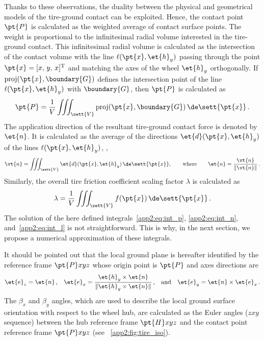 Thanks to these observations, the duality between the physical and geometrical models of the tire-ground contact can be exploited. Hence, the contact point $\pt{P}$ is calculated as the weighted average of contact surface points. The weight is proportional to the infinitesimal radial volume interested in the tire-ground contact. This infinitesimal radial volume is calculated as the intersection of the contact volume with the line $\ell(\pt{x},\et{h}_y)$ passing through the point $\pt{x} = [x, \, y, \, x]^\mathrm{T}$ and matching the axes of the wheel $\et{h}_y$ orthogonally. If $\mathrm{proj}(\pt{x},\boundary{G})$ defines the intersection point of the line $\ell(\pt{x},\et{h}_y)$ with $\boundary{G}$, then $\pt{P}$ is calculated as
%
\begin{equation}
  \pt{P} = \dfrac{1}{V} \displaystyle\iiint_\sett{V} \mathrm{proj}(\pt{x},\boundary{G}) \, \de\sett{\pt{x}}
  \, \text{.}
  \label{app2:eq:int_p}
\end{equation}
%
The application direction of the resultant tire-ground contact force is denoted by $\et{n}$. It is calculated as the average of the directions $\et{d}(\pt{x},\et{h}_y)$ of the lines $\ell(\pt{x},\et{h}_y)$, \ie{},
%
\begin{equation}
  \vt{n} = \displaystyle\iiint_\sett{V} \et{d}(\pt{x},\et{h}_y) \, \de\sett{\pt{x}},
  \qquad \text{where} \qquad
  \et{n} = \dfrac{\vt{n}}{\|\vt{n}\|}
  \, \text{.}
  \label{app2:eq:int_n}
\end{equation}
%
Similarly, the overall tire friction coefficient scaling factor $\lambda$ is calculated as
%
\begin{equation}
  \lambda = \dfrac{1}{V} \displaystyle\iiint_\sett{V} f(\pt{x}) \, \de\sett{\pt{x}}
  \, \text{.}
  \label{app2:eq:int_l}
\end{equation}
%
The solution of the here defined integrals~\eqref{app2:eq:int_p}, \eqref{app2:eq:int_n}, and~\eqref{app2:eq:int_l} is not straightforward. This is why, in the next section, we propose a numerical approximation of these integrals.

It should be pointed out that the local ground plane is hereafter identified by the reference frame $\pt{P}xyz$ whose origin point is $\pt{P}$ and axes directions are
%
\begin{align*}
  \et{e}_z = \et{n} \, \text{,} \quad
  \et{e}_x = \dfrac{\et{h}_y \times \et{n}}{\|\et{h}_y \times \et{n}\|} \, \text{,} \quad \text{and} \quad
  \et{e}_y = \et{n} \times \et{e}_x
  \, \text{.}
\end{align*}
%
The $\beta_x$ and $\beta_y$ angles, which are used to describe the local ground surface orientation with respect to the wheel hub, are calculated as the Euler angles ($zxy$ sequence) between the hub reference frame $\pt{H}xyz$ and the contact point reference frame $\pt{P}xyz$ (see \figurename{}~\ref{app2:fig:tire_iso}).


